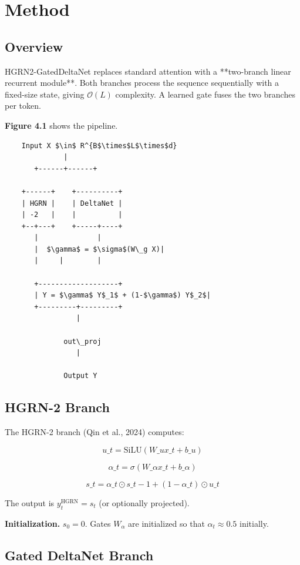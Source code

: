 \section{Method}

\subsection{Overview}

HGRN2-GatedDeltaNet replaces standard attention with a **two-branch linear 
recurrent module**. Both branches process the sequence sequentially with a 
fixed-size state, giving $\mathcal{O}(L)$ complexity. A learned gate fuses 
the two branches per token.

\textbf{Figure 4.1} shows the pipeline.

\begin{lstlisting}
    Input X $\in$ R^{B$\times$L$\times$d}
              |
       +------+------+
                      
    +------+    +----------+
    | HGRN |    | DeltaNet |
    | -2   |    |          |
    +--+---+    +-----+----+
       |              |
       |  $\gamma$ = $\sigma$(W\_g X)|
       |     |        |
                       
       +-------------------+
       | Y = $\gamma$ Y$_1$ + (1-$\gamma$) Y$_2$|
       +---------+---------+
                 |
                  
              out\_proj
                 |
                  
              Output Y
\end{lstlisting}

\subsection{HGRN-2 Branch}

The HGRN-2 branch (Qin et al., 2024) computes:

\[
u\_t = \text{SiLU}(W\_u x\_t + b\_u)
\tag{4.1}
\]

\[
\alpha\_t = \sigma(W\_\alpha x\_t + b\_\alpha)
\tag{4.2}
\]

\[
s\_t = \alpha\_t \odot s\_{t-1} + (1 - \alpha\_t) \odot u\_t
\tag{4.3}
\]

The output is $y_t^\text{HGRN} = s_t$ (or optionally projected).

\textbf{Initialization.} $s_0 = 0$. Gates $W_\alpha$ are initialized so that 
$\alpha_t \approx 0.5$ initially.

\subsection{Gated DeltaNet Branch}

